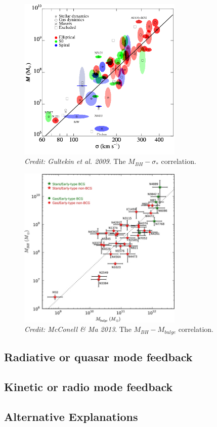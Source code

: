 \nocite{mcconnell2013,gultekin2009}
\begin{figure}
\centering
\includegraphics[width=0.7\textwidth]{figures/02-outflows/msigma.png}
\caption
{
{\sl Credit: Gultekin et al. 2009}. 
The $M_{BH}-\sigma_*$ correlation.
} 
\label{fig:mbulge}
\end{figure}

\begin{figure}
\centering
\includegraphics[width=0.7\textwidth]{figures/02-outflows/mbulge.jpg}
\caption
{
{\sl Credit: McConell \& Ma 2013}. 
The $M_{BH}-M_{bulge}$ correlation.
} 
\label{fig:mbulge}
\end{figure}

\subsection{Radiative or quasar mode feedback}

\subsection{Kinetic or radio mode feedback}

\subsection{Alternative Explanations}


